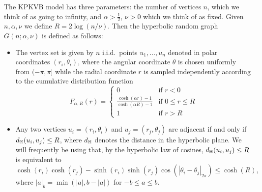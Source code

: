 The KPKVB model has three parameters: the number of vertices $n$, which we think of as going to infinity, and $\alpha > \frac{1}{2}$, $\nu > 0$ which we think of as fixed. Given $n, \alpha, \nu$ we define $R = 2\log(n/\nu)$. Then the hyperbolic random graph $G(n;\alpha, \nu)$ is defined as follows:
\begin{itemize}
\item The vertex set is given by $n$ i.i.d.~points $u_1, \dots, u_n$ denoted in polar coordinates $(r_i, \theta_i)$, where the angular coordinate $\theta$ is chosen uniformly from $(-\pi,\pi]$ while the radial coordinate $r$ is sampled independently according to the cumulative distribution function
\begin{equation}\label{eq:def_hyperbolic_point_distribution}
	F_{\alpha,R}(r) = \begin{cases}
		0 &\mbox{if } r < 0\\
		\frac{\cosh(\alpha r)-1}{\cosh(\alpha R) - 1} &\mbox{if } 0 \le r \le R\\
		1&\mbox{if } r > R
	\end{cases}
\end{equation}
\item Any two vertices $u_i=(r_i,\theta_i)$ and $u_j=(r_j,\theta_j)$ are adjacent if and only if $d_{\mathbb{H}}(u_i,u_j) \le R$, where $d_{\mathbb{H}}$ denotes the distance in the hyperbolic plane. We will frequently be using that, by the hyperbolic law of cosines, $d_{\mathbb{H}}(u_i,u_j) \le R$ is equivalent to
\[
	\cosh(r_i) \cosh(r_j) - \sinh(r_i) \sinh( r_j) \cos(|\theta_i-\theta_j|_{2\pi}) \le \cosh(R),
\]
where $|a|_{b} = \min( |a|, b - |a|)$ for $-b\leq a\leq b$.
\end{itemize}

